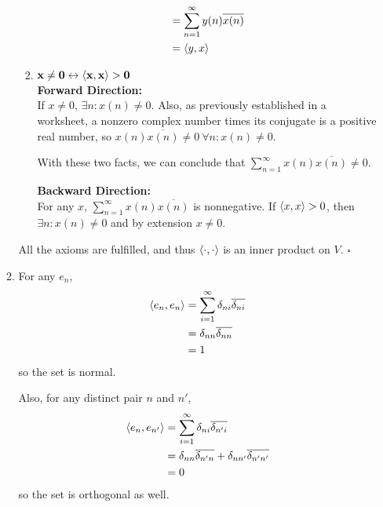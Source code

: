 \documentclass[12pt]{article}
\begin{document}
\begin{enumerate}
\begin{enumerate}
\begin{enumerate}
\begin{align*}
                                                                   & = \sum_{n=1}^{\infty} y(n)\overline{x(n)}                              \\
                                                                   & =\braket{y, x}
                                    \end{align*}
                              \item $\mathbf{x \ne 0 \leftrightarrow \braket{x, x}>0}$ \\
                                    \textbf{Forward Direction:} \\
                                    If $x \ne 0$, $\exists n: x(n) \ne 0$.
                                    Also, as previously established in a worksheet, a nonzero complex
                                    number times its conjugate is a positive real number, so
                                    $x(n)\overline{x(n)} \ne 0\ \forall n: x(n) \ne 0$.
                                    
                                    With these two facts, we can conclude that
                                    $\sum_{n=1}^{\infty} x(n) \overline{x(n)} \ne 0$.

                                    \textbf{Backward Direction:} \\
                                    For any $x$, $\sum_{n=1}^{\infty} x(n)\overline{x(n)}$ is nonnegative.
                                    If $\braket{x, x}>0$, then $\exists n: x(n) \ne 0$ and by extension $x \ne 0$.
                        \end{enumerate}
                        All the axioms are fulfilled, and thus
                        $\braket{\cdot, \cdot}$ is an inner product on $V$. $\square$
                  \item For any $e_n$,
                        \begin{align*}
                              \braket{e_n, e_n} & =\sum_{i=1}^{\infty} \delta_{ni}\overline{\delta_{ni}} \\
                                                & = \delta_{nn}\overline{\delta_{nn}}                    \\
                                                & = 1
                        \end{align*}
                        so the set is normal.

                        Also, for any distinct pair $n$ and $n'$,
                        \begin{align*}
                              \braket{e_n, e_{n'}} & = \sum_{i=1}^{\infty} \delta_{ni}\overline{\delta_{n'i}}                   \\
                                                   & = \delta_{nn}\overline{\delta_{n'n}} +\delta_{nn'}\overline{\delta_{n'n'}} \\
                                                   & = 0
                        \end{align*}
                        so the set is orthogonal as well.


\end{enumerate}
\end{enumerate}
\end{document}
